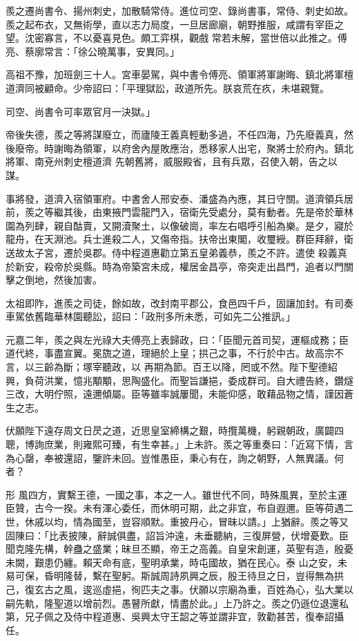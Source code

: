 \begin{pinyinscope}
 羨之遷尚書令、揚州刺史，加散騎常侍。進位司空、錄尚書事，常侍、刺史如故。羨之起布衣，又無術學，直以志力局度，一旦居廊廟，朝野推服，咸謂有宰臣之望。沈密寡言，不以憂喜見色。頗工弈棋，觀戲
 常若未解，當世倍以此推之。傅亮、蔡廓常言：「徐公曉萬事，安異同。」



 高祖不豫，加班劍三十人。宮車晏駕，與中書令傅亮、領軍將軍謝晦、鎮北將軍檀道濟同被顧命。少帝詔曰：「平理獄訟，政道所先。朕哀荒在疚，未堪親覽。



 司空、尚書令可率眾官月一決獄。」



 帝後失德，羨之等將謀廢立，而廬陵王義真輕動多過，不任四海，乃先廢義真，然後廢帝。時謝晦為領軍，以府舍內屋敗應治，悉移家人出宅，聚將士於府內。鎮北將軍、南兗州刺史檀道濟
 先朝舊將，威服殿省，且有兵眾，召使入朝，告之以謀。



 事將發，道濟入宿領軍府。中書舍人邢安泰、潘盛為內應，其日守關。道濟領兵居前，羨之等繼其後，由東掖門雲龍門入，宿衛先受處分，莫有動者。先是帝於華林園為列肆，親自酤賣，又開瀆聚土，以像破崗，率左右唱呼引船為樂。是夕，寢於龍舟，在天淵池。兵士進殺二人，又傷帝指。扶帝出東閣，收璽綬。群臣拜辭，衛送故太子宮，遷於吳郡。侍中程道惠勸立第五皇弟義恭，羨之不許。遣使
 殺義真於新安，殺帝於吳縣。時為帝築宮未成，權居金昌亭，帝突走出昌門，追者以門關擊之倒地，然後加害。



 太祖即阼，進羨之司徒，餘如故，改封南平郡公，食邑四千戶，固讓加封。有司奏車駕依舊臨華林園聽訟，詔曰：「政刑多所未悉，可如先二公推訊。」



 元嘉二年，羨之與左光祿大夫傅亮上表歸政，曰：「臣聞元首司契，運樞成務；臣道代終，事盡宣翼。冕旒之道，理絕於上皇；拱己之事，不行於中古。故高宗不言，以三齡為斷；塚宰聽政，以
 再期為節。百王以降，罔或不然。陛下聖德紹興，負荷洪業，憶兆顒顒，思陶盛化。而聖旨謙挹，委成群司。自大禮告終，鑽燧三改，大明佇照，遠邇傾屬。臣等雖率誠屢聞，未能仰感，敢藉品物之情，謹因蒼生之志。



 伏願陛下遠存周文日昃之道，近思皇室締構之艱，時攬萬機，躬親朝政，廣闢四聰，博詢庶業，則雍熙可臻，有生幸甚。」上未許。羨之等重奏曰：「近寫下情，言為心罄，奉被還詔，鑒許未回。豈惟愚臣，秉心有在，詢之朝野，人無異議。何者？



 形
 風四方，實繫王德，一國之事，本之一人。雖世代不同，時殊風異，至於主運臣贊，古今一揆。未有渾心委任，而休明可期，此之非宜，布自遐邇。臣等荷遇二世，休戚以均，情為國至，豈容順默。重披丹心，冒昧以請。」上猶辭。羨之等又固陳曰：「比表披陳，辭誠俱盡，詔旨沖遠，未垂聽納，三復屏營，伏增憂歎。臣聞克隆先構，幹蠱之盛業；昧旦丕顯，帝王之高義。自皇宋創運，英聖有造，殷憂未闕，艱患仍纏。賴天命有底，聖明承業，時屯國故，猶在民心。泰
 山之安，未易可保，昏明隆替，繫在聖躬。斯誠周詩夙興之辰，殷王待旦之日，豈得無為拱己，復玄古之風，逡巡虛挹，徇匹夫之事。伏願以宗廟為重，百姓為心，弘大業以嗣先軌，隆聖道以增前烈。愚瞽所獻，情盡於此。」上乃許之。羨之仍遜位退還私第，兄子佩之及侍中程道惠、吳興太守王韶之等並謂非宜，敦勸甚苦，復奉詔攝任。




\end{pinyinscope}
